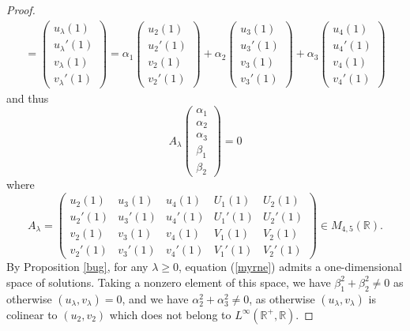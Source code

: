 \documentclass[11 pt]{amsart}
\theoremstyle{definition}
\theoremstyle{remark}
\numberwithin{equation}{section}
\begin{document}
\begin{proof}
\begin{eqnarray*}
= \left(\begin{array}{c}
      u_{\lambda} (1)\\
      u_{\lambda}' (1)\\
      v_{\lambda} (1)\\
      v_{\lambda}' (1)
    \end{array}\right)
=  \alpha_1 \left(\begin{array}{c}
      u_2 (1)\\
      u_2' (1)\\
      v_2 (1)\\
      v_2' (1)
    \end{array}\right) + \alpha_2 \left(\begin{array}{c}
      u_3 (1)\\
      u_3' (1)\\
      v_3 (1)\\
      v_3' (1)
    \end{array}\right) + \alpha_3 \left(\begin{array}{c}
      u_4 (1)\\
      u_4' (1)\\
      v_4 (1)\\
      v_4' (1)
    \end{array}\right)
  \end{eqnarray*}
  and thus
  \begin{equation}
    A_{\lambda} \left(\begin{array}{c}
      \alpha_1\\
      \alpha_2\\
      \alpha_3\\
      \beta_1\\
      \beta_2
    \end{array}\right) = 0 \label{myrne}
  \end{equation}
  where
  \[ A_{\lambda} = \left(\begin{array}{ccccc}
       u_2 (1) & u_3 (1) & u_4 (1) & U_1 (1) & U_2 (1)\\
       u_2' (1) & u_3' (1) & u_4' (1) & U_1' (1) & U_2' (1)\\
       v_2 (1) & v_3 (1) & v_4 (1) & V_1 (1) & V_2 (1)\\
       v_2' (1) & v_3' (1) & v_4' (1) & V_1' (1) & V_2' (1)
     \end{array}\right) \in M_{4, 5} (\mathbb{R}) . \]
  By Proposition \ref{bug}, for any $\lambda \geqslant 0$, equation
  (\ref{myrne}) admits a one-dimensional space of solutions. Taking a nonzero
  element of this space, we have $\beta_1^2 + \beta_2^2 \neq 0$ as otherwise
  $(u_{\lambda}, v_{\lambda}) = 0$, and we have $\alpha_2^2 + \alpha_3^2 \neq
  0$, as otherwise $(u_{\lambda}, v_{\lambda})$ is colinear to $(u_2, v_2)$
  which does not belong to $L^{\infty} (\mathbb{R}^+, \mathbb{R})$.
  

\end{proof}
\end{document}
